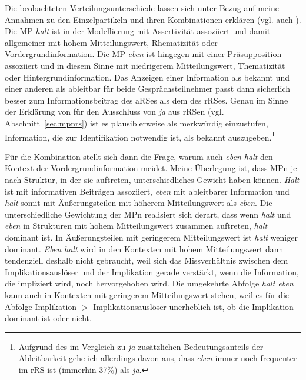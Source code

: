 \noindent
Die beobachteten Verteilungsunterschiede lassen sich unter Bezug auf meine Annahmen zu den Einzelpartikeln und ihren Kombinationen erklären (vgl. auch \citealt[172-173]{Mueller2016a}). Die MP \textit{halt} ist in der Modellierung mit Assertivität  assoziiert und damit allgemeiner mit hohem Mitteilungswert, Rhematizität  oder  Vordergrundinformation. Die MP \textit{eben} ist hingegen mit einer Präsupposition assoziiert und in diesem Sinne mit  niedrigerem Mitteilungswert, Thematizität  oder Hintergrundinformation. Das Anzeigen einer Information als bekannt und einer anderen als ableitbar für beide Gesprächsteilnehmer passt dann sicherlich besser zum Informationsbeitrag des aRSes als dem des rRSes. Genau im Sinne der Er\-klärung von \citet{Hentschel1986} für den Ausschluss von \textit{ja} aus rRSen (vgl. Abschnitt~\ref{sec:mpnrs}) ist es plausiblerweise als merkwürdig einzustufen, Information, die zur Identifikation notwendig ist, als bekannt auszugeben.\footnote{Aufgrund des im Vergleich zu \textit{ja} zusätzlichen Bedeutungsanteils der Ableitbarkeit gehe ich allerdings davon aus, dass \textit{eben} immer noch frequenter im rRS ist (immerhin 37\%) als \textit{ja}.}

Für die Kombination stellt sich dann die Frage, warum auch \textit{eben halt} den Kontext der Vordergrundinformation meidet. Meine Überlegung ist, dass MPn je nach Struktur, in der sie auftreten, unterschiedliches Gewicht haben können. \textit{Halt} ist mit informativen Beiträgen assoziiert, \textit{eben} mit ableitbarer Information und \textit{halt} somit mit Äußerungsteilen mit höherem Mitteilungswert als \textit{eben}. Die unterschiedliche Gewichtung der MPn realisiert sich derart, dass wenn \textit{halt} und \textit{eben} in Strukturen mit hohem Mitteilungswert zusammen auftreten, \textit{halt} do\-minant ist. In Äußerungsteilen mit geringerem Mitteilungswert ist \textit{halt} weniger dominant. \textit{Eben halt} wird in den Kontexten mit hohem Mitteilungswert dann tendenziell deshalb nicht gebraucht, weil sich das Missverhältnis zwischen dem Implikationsauslöser und der Implikation gerade verstärkt, wenn die Information, die impliziert wird, noch hervorgehoben wird. Die umgekehrte Abfolge \textit{halt eben} kann auch in Kontexten mit geringerem Mitteilungswert stehen, weil es für die Abfolge Implikation $>$ Implikationsauslöser unerheblich ist, ob die Implikation dominant ist oder nicht.

